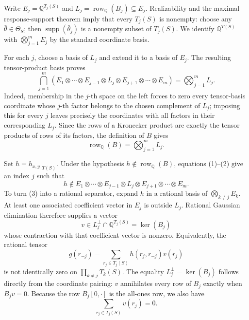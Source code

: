 Write \(E_j=\mathbb Q^{T_j(S)}\) and \(L_j=\operatorname{row}_{\mathbb Q}(B_j)\subseteq E_j\).  Realizability and the maximal-response-support theorem imply that every \(T_j(S)\) is nonempty: choose any \(\bar\theta\in\Theta_S\); then \(\operatorname{supp}(\bar\theta_j)\) is a nonempty subset of \(T_j(S)\).  We identify \(\mathbb Q^{T(S)}\) with \(\bigotimes_{j=1}^m E_j\) by the standard coordinate basis.

For each \(j\), choose a basis of \(L_j\) and extend it to a basis of \(E_j\).  The resulting tensor-product basis proves
\[
\bigcap_{j=1}^m
\left(E_1\otimes\cdots\otimes E_{j-1}\otimes L_j
\otimes E_{j+1}\otimes\cdots\otimes E_m\right)
=\bigotimes_{j=1}^m L_j.                                      \tag{1}
\]
Indeed, membership in the \(j\)-th space on the left forces to zero every tensor-basis coordinate whose \(j\)-th factor belongs to the chosen complement of \(L_j\); imposing this for every \(j\) leaves precisely the coordinates with all factors in their corresponding \(L_j\).  Since the rows of a Kronecker product are exactly the tensor products of rows of its factors, the definition of \(B\) gives
\[
\operatorname{row}_{\mathbb Q}(B)=\bigotimes_{j=1}^mL_j.     \tag{2}
\]

Set \(h=h_{x,y}|_{T(S)}\).  Under the hypothesis \(h\notin\operatorname{row}_{\mathbb Q}(B)\), equations (1)--(2) give an index \(j\) such that
\[
h\notin E_1\otimes\cdots\otimes E_{j-1}\otimes L_j
\otimes E_{j+1}\otimes\cdots\otimes E_m.                    \tag{3}
\]
To turn (3) into a rational separator, expand \(h\) in a rational basis of \(\bigotimes_{k\ne j}E_k\).  At least one associated coefficient vector in \(E_j\) is outside \(L_j\).  Rational Gaussian elimination therefore supplies a vector
\[
v\in L_j^\perp\cap\mathbb Q^{T_j(S)}=\ker(B_j)
\]
whose contraction with that coefficient vector is nonzero.  Equivalently, the rational tensor
\[
g(r_{-j})=
\sum_{r_j\in T_j(S)}h(r_j,r_{-j})v(r_j)                       \tag{4}
\]
is not identically zero on \(\prod_{k\ne j}T_k(S)\).  The equality \(L_j^\perp=\ker(B_j)\) follows directly from the coordinate pairing: \(v\) annihilates every row of \(B_j\) exactly when \(B_jv=0\).  Because the row \(B_j[0,\cdot]\) is the all-ones row, we also have
\[
\sum_{r_j\in T_j(S)}v(r_j)=0.                                \tag{5}
\]


